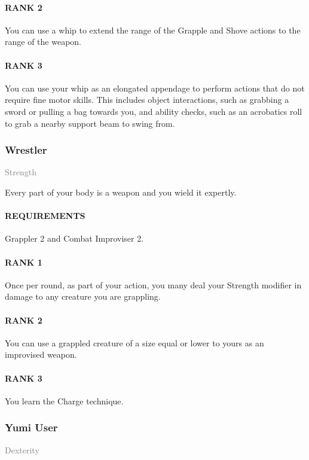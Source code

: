 \paragraph{RANK 2} You can use a whip to extend the range of the Grapple and Shove actions to the range of the weapon.
\paragraph{RANK 3} You can use your whip as an elongated appendage to perform actions that do not require fine motor skills.
This includes object interactions, such as grabbing a sword or pulling a bag towards you, and ability checks, such as an acrobatics roll to grab a nearby support beam to swing from.

\subsubsection{Wrestler} \label{feat::wrestler}
\small{\textcolor{gray}{Strength}}

\normalsize
Every part of your body is a weapon and you wield it expertly.
\paragraph{REQUIREMENTS} Grappler 2 and Combat Improviser 2.
\paragraph{RANK 1} Once per round, as part of your action, you many deal your Strength modifier in damage to any creature you are grappling.
\paragraph{RANK 2} You can use a grappled creature of a size equal or lower to yours as an improvised weapon.
\paragraph{RANK 3} You learn the Charge technique.

\subsubsection{Yumi User} \label{feat::yumiuser}
\small{\textcolor{gray}{Dexterity}}

